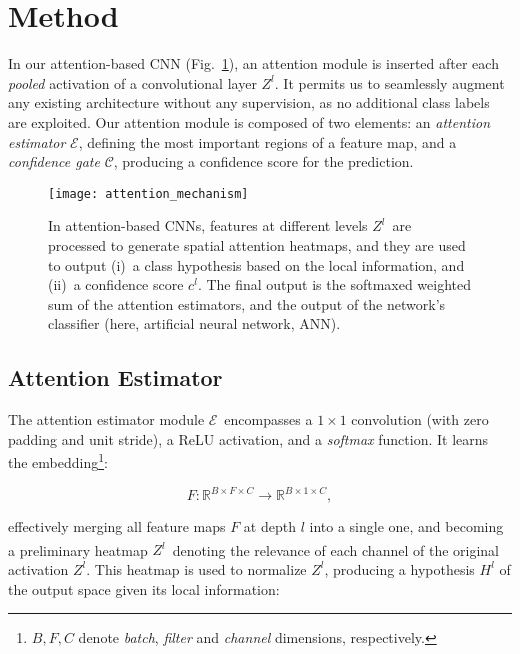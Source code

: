 \documentclass[journal]{IEEEtran}
\newcommand{\Activation}{$\mathit{Z}^ {l}$}
\newcommand{\SoftmaxActivation}{$\hat{\mathit{Z}^{l}}$}
\newcommand{\AttentionEstimator}{$\mathcal{E}$}
\newcommand{\ConfidenceGate}{$\mathcal{C}$}
\begin{document}
\section{Method}\label{sec:method}


In our attention-based CNN (Fig.~\ref{attention_mechanism}), an attention module is inserted after each \emph{pooled} activation of a convolutional layer \Activation. It permits us to seamlessly augment any existing architecture without any supervision, as no additional class labels are exploited. Our attention module is composed of two elements: an \emph{attention estimator} \AttentionEstimator, defining the most important regions of a feature map, and a \emph{confidence gate} \ConfidenceGate, producing a confidence score for the prediction.

\begin{figure}[h]
\centering
\texttt{[image: attention\_mechanism]}
\caption{In attention-based CNNs, features at different levels \Activation~are processed to generate spatial attention heatmaps, and they are used to output (i)~a class hypothesis based on the local information, and (ii)~a confidence score $c^{l}$. The final output is the softmaxed weighted sum of the attention estimators, and the output of the network's classifier (here, artificial neural network, ANN).}
\label{attention_mechanism}
\end{figure}



\subsection{Attention Estimator}\label{sec:attention_estimator}

The attention estimator module \AttentionEstimator~encompasses a $1\times 1$ convolution (with zero padding and unit stride), a ReLU activation, and a \emph{softmax} function. It learns the embedding\footnote{$B, F, C$ denote \textit{batch}, \textit{filter} and \textit{channel} dimensions, respectively.}:

\begin{equation}
F : \mathbb{R}^{B\times F\times C}\rightarrow \mathbb{R}^{B\times 1\times C},
\end{equation}

\noindent effectively merging all feature maps $F$ at depth $l$ into a single one, and becoming a preliminary heatmap \SoftmaxActivation~denoting the relevance of each channel of the original activation \Activation. This heatmap is used to normalize \Activation, producing a hypothesis $H^{l}$ of the output space given its local information:
\end{document}

